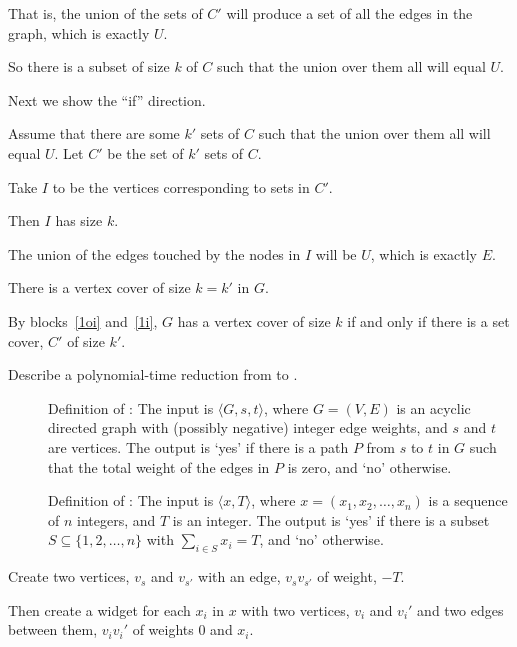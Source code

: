 \documentclass[11pt]{article}
\newcommand{\PROB}[2]{
  \begin{description}
  \item[]Definition of \prob{#1}:#2
  \end{description}
}
\begin{document}
\begin{problems}
\begin{longFormProof}
\begin{block}[1oi]
      \step That is, the union of the sets of $C'$ will produce a set of all the edges in the graph, which is exactly $U$.

      \smallskip 
      \step So there is a subset of size $k$ of $C$ such that the union over them all will equal $U$.
    \end{block} 
    \step Next we show the ``if'' direction.
    \begin{block}[1i]
      {Assume that there are some $k'$ sets of $C$ such that the union over them all will equal $U$.}
      \step Let $C'$ be the set of $k'$ sets of $C$.
      \smallskip 

      \step Take $I$ to be the vertices corresponding to sets in $C'$.

      \step Then $I$ has size $k$.

      \step The union of the edges touched by the nodes in $I$ will be $U$, which is exactly $E$.

      \smallskip 
      \step There is a vertex cover of size $k=k'$ in $G$. 
    \end{block} 
    \step By blocks~\ref{1oi} and~\ref{1i},
    $G$ has a vertex cover of size $k$
    if and only if there is a set cover, $C'$ of size $k'$.
  \end{longFormProof}

  \newpage
  \problem %

  Describe a polynomial-time reduction from  to . 

  \PROB{Zero Path}{
    The input is $\langle G, s, t \rangle$,
    where $G=(V,E)$ is an acyclic directed graph with (possibly negative) integer edge weights,
    and $s$ and $t$ are vertices.
    The output is `yes' if there is a path $P$ from $s$ to $t$ in $G$ such that the total weight of the edges in $P$ is zero,
    and `no' otherwise.}

  \PROB{Subset Sum}{
    The input is $\langle x, T\rangle$,
    where $x=(x_1, x_2, \ldots, x_n)$ is a sequence of $n$ integers,  and $T$ is an integer.
    The output is `yes' if there is a subset $S\subseteq \{1,2,\ldots,n\}$
    with $\sum_{i\in S} x_i = T$, and `no' otherwise.}

  \lineacross 
  Create two vertices, $v_s$ and $v_{s'}$ with an edge, $v_sv_{s'}$ of weight, $-T$.

  Then create a widget for each $x_i$ in $x$ with two vertices, $v_i$ and $v_i'$ and two edges between them, $v_iv_i'$ of weights 0 and $x_i$.


\end{problems}
\end{document}
